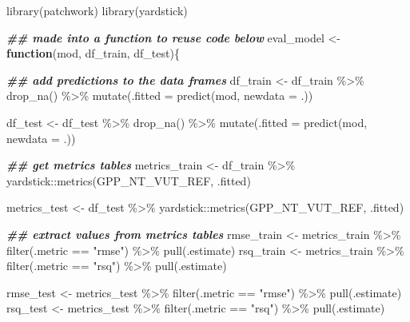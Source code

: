 \documentclass[
]{book}
\newenvironment{Shaded}{\begin{snugshade}}{\end{snugshade}}
\newcommand{\AttributeTok}[1]{\textcolor[rgb]{0.77,0.63,0.00}{#1}}
\newcommand{\ControlFlowTok}[1]{\textcolor[rgb]{0.13,0.29,0.53}{\textbf{#1}}}
\newcommand{\DocumentationTok}[1]{\textcolor[rgb]{0.56,0.35,0.01}{\textbf{\textit{#1}}}}
\newcommand{\FunctionTok}[1]{\textcolor[rgb]{0.00,0.00,0.00}{#1}}
\newcommand{\NormalTok}[1]{#1}
\newcommand{\OtherTok}[1]{\textcolor[rgb]{0.56,0.35,0.01}{#1}}
\newcommand{\SpecialCharTok}[1]{\textcolor[rgb]{0.00,0.00,0.00}{#1}}
\newcommand{\StringTok}[1]{\textcolor[rgb]{0.31,0.60,0.02}{#1}}
\begin{document}
\begin{Shaded}
\begin{Highlighting}[]
\FunctionTok{library}\NormalTok{(patchwork)}
\FunctionTok{library}\NormalTok{(yardstick)}

\DocumentationTok{\#\# made into a function to reuse code below}
\NormalTok{eval\_model }\OtherTok{\textless{}{-}} \ControlFlowTok{function}\NormalTok{(mod, df\_train, df\_test)\{}
  
  \DocumentationTok{\#\# add predictions to the data frames}
\NormalTok{  df\_train }\OtherTok{\textless{}{-}}\NormalTok{ df\_train }\SpecialCharTok{\%\textgreater{}\%} 
    \FunctionTok{drop\_na}\NormalTok{() }\SpecialCharTok{\%\textgreater{}\%} 
    \FunctionTok{mutate}\NormalTok{(}\AttributeTok{.fitted =} \FunctionTok{predict}\NormalTok{(mod, }\AttributeTok{newdata =}\NormalTok{ .))}
  
\NormalTok{  df\_test }\OtherTok{\textless{}{-}}\NormalTok{ df\_test }\SpecialCharTok{\%\textgreater{}\%} 
    \FunctionTok{drop\_na}\NormalTok{() }\SpecialCharTok{\%\textgreater{}\%} 
    \FunctionTok{mutate}\NormalTok{(}\AttributeTok{.fitted =} \FunctionTok{predict}\NormalTok{(mod, }\AttributeTok{newdata =}\NormalTok{ .))}
  
  \DocumentationTok{\#\# get metrics tables}
\NormalTok{  metrics\_train }\OtherTok{\textless{}{-}}\NormalTok{ df\_train }\SpecialCharTok{\%\textgreater{}\%} 
\NormalTok{    yardstick}\SpecialCharTok{::}\FunctionTok{metrics}\NormalTok{(GPP\_NT\_VUT\_REF, .fitted)}
  
\NormalTok{  metrics\_test }\OtherTok{\textless{}{-}}\NormalTok{ df\_test }\SpecialCharTok{\%\textgreater{}\%} 
\NormalTok{    yardstick}\SpecialCharTok{::}\FunctionTok{metrics}\NormalTok{(GPP\_NT\_VUT\_REF, .fitted)}
  
  \DocumentationTok{\#\# extract values from metrics tables}
\NormalTok{  rmse\_train }\OtherTok{\textless{}{-}}\NormalTok{ metrics\_train }\SpecialCharTok{\%\textgreater{}\%} 
    \FunctionTok{filter}\NormalTok{(.metric }\SpecialCharTok{==} \StringTok{"rmse"}\NormalTok{) }\SpecialCharTok{\%\textgreater{}\%} 
    \FunctionTok{pull}\NormalTok{(.estimate)}
\NormalTok{  rsq\_train }\OtherTok{\textless{}{-}}\NormalTok{ metrics\_train }\SpecialCharTok{\%\textgreater{}\%} 
    \FunctionTok{filter}\NormalTok{(.metric }\SpecialCharTok{==} \StringTok{"rsq"}\NormalTok{) }\SpecialCharTok{\%\textgreater{}\%} 
    \FunctionTok{pull}\NormalTok{(.estimate)}
  
\NormalTok{  rmse\_test }\OtherTok{\textless{}{-}}\NormalTok{ metrics\_test }\SpecialCharTok{\%\textgreater{}\%} 
    \FunctionTok{filter}\NormalTok{(.metric }\SpecialCharTok{==} \StringTok{"rmse"}\NormalTok{) }\SpecialCharTok{\%\textgreater{}\%} 
    \FunctionTok{pull}\NormalTok{(.estimate)}
\NormalTok{  rsq\_test }\OtherTok{\textless{}{-}}\NormalTok{ metrics\_test }\SpecialCharTok{\%\textgreater{}\%} 
    \FunctionTok{filter}\NormalTok{(.metric }\SpecialCharTok{==} \StringTok{"rsq"}\NormalTok{) }\SpecialCharTok{\%\textgreater{}\%} 
    \FunctionTok{pull}\NormalTok{(.estimate)}
  

\end{Highlighting}
\end{Shaded}
\end{document}
